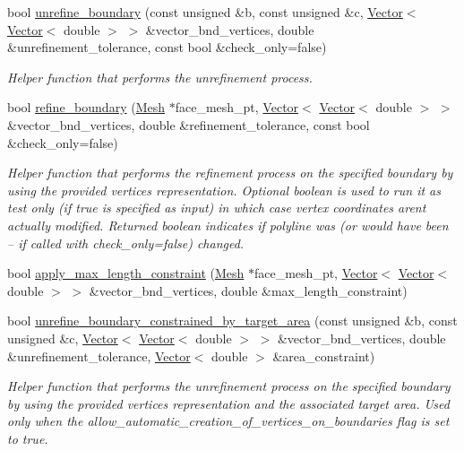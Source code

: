 \begin{DoxyCompactItemize}
bool \hyperlink{classoomph_1_1RefineableTriangleMesh_a504b89cdb0149dc7cbbf50bc270829fe}{unrefine\+\_\+boundary} (const unsigned \&b, const unsigned \&c, \hyperlink{classoomph_1_1Vector}{Vector}$<$ \hyperlink{classoomph_1_1Vector}{Vector}$<$ double $>$ $>$ \&vector\+\_\+bnd\+\_\+vertices, double \&unrefinement\+\_\+tolerance, const bool \&check\+\_\+only=false)
\begin{DoxyCompactList}\small\item\em Helper function that performs the unrefinement process. \end{DoxyCompactList}\item 
bool \hyperlink{classoomph_1_1RefineableTriangleMesh_a9bd4d46e9a61131b8b8f2b68579ac972}{refine\+\_\+boundary} (\hyperlink{classoomph_1_1Mesh}{Mesh} $\ast$face\+\_\+mesh\+\_\+pt, \hyperlink{classoomph_1_1Vector}{Vector}$<$ \hyperlink{classoomph_1_1Vector}{Vector}$<$ double $>$ $>$ \&vector\+\_\+bnd\+\_\+vertices, double \&refinement\+\_\+tolerance, const bool \&check\+\_\+only=false)
\begin{DoxyCompactList}\small\item\em Helper function that performs the refinement process on the specified boundary by using the provided vertices representation. Optional boolean is used to run it as test only (if true is specified as input) in which case vertex coordinates aren\textquotesingle{}t actually modified. Returned boolean indicates if polyline was (or would have been -- if called with check\+\_\+only=false) changed. \end{DoxyCompactList}\item 
bool \hyperlink{classoomph_1_1RefineableTriangleMesh_abcfd90d11b4bc87de160736c0542d65c}{apply\+\_\+max\+\_\+length\+\_\+constraint} (\hyperlink{classoomph_1_1Mesh}{Mesh} $\ast$face\+\_\+mesh\+\_\+pt, \hyperlink{classoomph_1_1Vector}{Vector}$<$ \hyperlink{classoomph_1_1Vector}{Vector}$<$ double $>$ $>$ \&vector\+\_\+bnd\+\_\+vertices, double \&max\+\_\+length\+\_\+constraint)
\item 
bool \hyperlink{classoomph_1_1RefineableTriangleMesh_ad06aa82d81a16d5948b4317608a67aae}{unrefine\+\_\+boundary\+\_\+constrained\+\_\+by\+\_\+target\+\_\+area} (const unsigned \&b, const unsigned \&c, \hyperlink{classoomph_1_1Vector}{Vector}$<$ \hyperlink{classoomph_1_1Vector}{Vector}$<$ double $>$ $>$ \&vector\+\_\+bnd\+\_\+vertices, double \&unrefinement\+\_\+tolerance, \hyperlink{classoomph_1_1Vector}{Vector}$<$ double $>$ \&area\+\_\+constraint)
\begin{DoxyCompactList}\small\item\em Helper function that performs the unrefinement process on the specified boundary by using the provided vertices representation and the associated target area. Used only when the \textquotesingle{}allow\+\_\+automatic\+\_\+creation\+\_\+of\+\_\+vertices\+\_\+on\+\_\+boundaries\textquotesingle{} flag is set to true. \end{DoxyCompactList}\item 

\end{DoxyCompactItemize}

